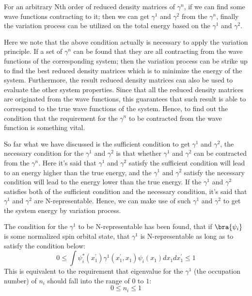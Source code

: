 For an arbitrary Nth order of reduced density matrices of
$\gamma^{n}$, if we can find some wave functions contracting to it;
then we can get $\gamma^{1}$ and $\gamma^{2}$ from the $\gamma^{n}$,
finally the variation process can be utilized on the total energy
based on the $\gamma^{1}$ and $\gamma^{2}$.

Here we note that the above condition actually is necessary to apply
the variation principle. If a set of $\gamma^{n}$ can be found that
they are all contracting from the wave functions of the
corresponding system; then the variation process can be strike up to
find the best reduced density matrices which is to minimize the
energy of the system. Furthermore, the result reduced density
matrices can also be used to evaluate the other system properties.
Since that all the reduced density matrices are originated from the
wave functions, this guarantees that such result is able to
correspond to the true wave functions of the system. Hence, to find
out the condition that the requirement for the $\gamma^{n}$ to be
contracted from the wave function is something vital.

So far what we have discussed is the sufficient condition to get
$\gamma^{1}$ and $\gamma^{2}$, the necessary condition for the
$\gamma^{1}$ and $\gamma^{2}$ is that whether $\gamma^{1}$ and
$\gamma^{2}$ can be contracted from the $\gamma^{n}$. Here it's said
that $\gamma^{1}$ and $\gamma^{2}$ satisfy the sufficient condition
will lead to an energy higher than the true energy, and the
$\gamma^{1}$ and $\gamma^{2}$ satisfy the necessary condition will
lead to the energy lower than the true energy\cite{weitaoYang}. If
the $\gamma^{1}$ and $\gamma^{2}$ satisfies both of the sufficient
condition and the necessary condition, it's said that $\gamma^{1}$
and $\gamma^{2}$ are N-representable. Hence, we can make use of such
$\gamma^{1}$ and $\gamma^{2}$ to get the system energy by variation
process.

The condition for the $\gamma^{1}$ to be N-representable has been
found, that if $\bra{\psi_{i}}$ is some normalized spin orbital
state, that $\gamma^{1}$ is N-representable as long as to satisfy
the condition below:
\begin{equation}\label{}
  0 \leq \int
  \psi_{i}^{*}(x_{1}^{'})\gamma^{1}(x_{1}^{'},x_{1})\psi_{i}(x_{1})dx_{1}dx_{1}^{'}
  \leq 1
\end{equation}
This is equivalent to the requirement that eigenvalue for the
$\gamma^{1}$ (the occupation number) of $n_{i}$ should fall into the
range of $0$ to $1$:
\begin{equation}\label{}
  0 \leq n_{i} \leq 1
\end{equation}

